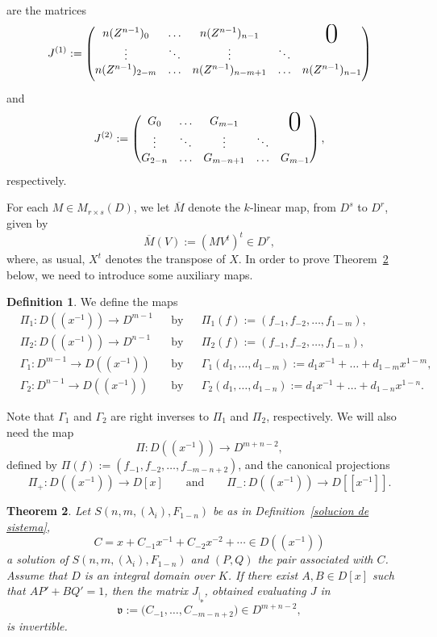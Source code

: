 \documentclass[reqno,a4paper]{amsart}
\newtheorem{theorem}{Theorem}[section]
\theoremstyle{definition}
\newtheorem{definition}[theorem]{Definition}
\theoremstyle{remark}
\newcommand{\ov}{\overline}
\newcommand{\BigFig}[1]{\parbox{12pt}{\Huge #1}}
\newcommand{\BigZero}{\BigFig{0}}
\begin{document}
are the matrices
$$
J^{(1)} := \begin{pmatrix} n(Z^{n-1})_{0} & \dots & n(Z^{n-1})_{n-1} & & \BigZero\\
%
\vdots &\ddots &\vdots &\ddots \\
%
n(Z^{n-1})_{2-m}  &\dots & n(Z^{n-1})_{n-m+1} &\dots & n(Z^{n-1})_{n-1}\\[5pt]
\end{pmatrix}
$$
and
$$
J^{(2)} := \begin{pmatrix} G_{0} &\dots & G_{m-1} && \BigZero\\
%
\vdots &\ddots &\vdots &\ddots \\
%
G_{2-n} &\dots & G_{m-n+1} &\dots & G_{m-1}
\end{pmatrix},
$$
respectively.

\smallskip

For each $M\in M_{r\times s}(D)$, we let $\ov{M}$ denote the $k$-linear map, from $D^s$ to $D^r$, given by
$$
\ov{M}(V):= (M V^t)^t\in D^r,
$$
where, as usual, $X^t$ denotes the transpose of $X$. In order to prove
Theorem~\ref{Jinvertible} below, we need to introduce some auxiliary maps.

\begin{definition} We define the maps
\begin{align*}
&\Pi_1\colon D((x^{-1}))\to D^{m-1}&&\text{by} &&\Pi_1(f):=(f_{-1},f_{-2},\dots,f_{1-m}), \\
%
&\Pi_2\colon D((x^{-1}))\to D^{n-1}&&\text{by} &&\Pi_2(f):=(f_{-1},f_{-2},\dots,f_{1-n}),\\
%
&\Gamma_1\colon D^{m-1}\to D((x^{-1}))&&\text{by} &&\Gamma_1(d_1,\dots,d_{1-m}):=
d_1 x^{-1}+\dots+d_{1-m}x^{1-m},\\
%
&\Gamma_2\colon D^{n-1}\to D((x^{-1}))&&\text{by} &&\Gamma_2(d_1,\dots,d_{1-n}):=
d_1 x^{-1}+\dots+ d_{1-n} x^{1-n}.
\end{align*}
\end{definition}

Note that $\Gamma_1$ and $\Gamma_2$ are right inverses to $\Pi_1$ and $\Pi_2$,
respectively. We will also need the map
$$
\Pi\colon D((x^{-1}))\longrightarrow D^{m+n-2},
$$
defined by $\Pi(f) := (f_{-1},f_{-2},\dots,f_{-m-n+2})$, and the canonical projections
$$
\Pi_+\colon D((x^{-1}))\to D[x]\qquad\text{and}\qquad \Pi_-\colon D((x^{-1}))\to D[[x^{-1}]].
$$

\begin{theorem}\label{Jinvertible} Let $S(n,m,(\lambda_i),F_{1-n})$ be as in
Definition~\ref{solucion de sistema},
$$
C = x + C_{-1} x^{-1} +  C_{-2} x^{-2} + \cdots \in D((x^{-1}))
$$
a solution of $S(n,m,(\lambda_i),F_{1-n})$ and $(P,Q)$ the pair associated with $C$.
Assume that $D$ is an integral domain over $K$. If there exist $A,B\in D[x]$ such
that $AP'+BQ'=1$, then the matrix $J_{|_{\mathfrak{v}}}$, obtained evaluating $J$ in
$$
\mathfrak{v}:=\bigl(C_{-1},\dots,C_{-m-n+2}\bigr)\in D^{m+n-2},
$$
is invertible.
\end{theorem}
\end{document}
